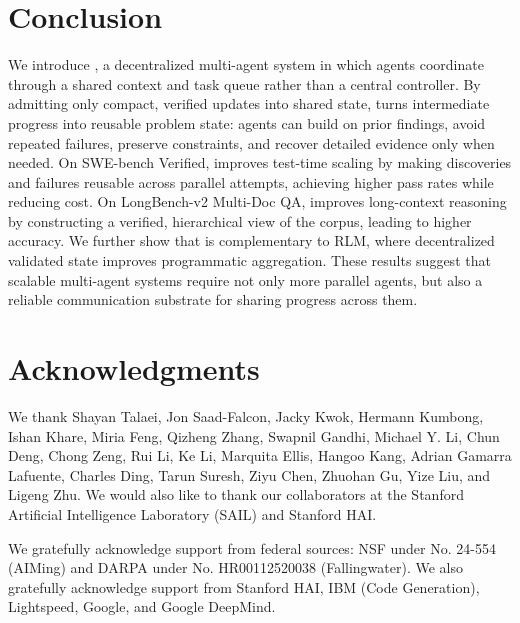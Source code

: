 \section{Conclusion}
\vspace{-1mm}
We introduce \toolName{}, a decentralized multi-agent system in which agents coordinate through a shared context and task queue rather than a central controller. By admitting only compact, verified updates into shared state, \toolName{} turns intermediate progress into reusable problem state: agents can build on prior findings, avoid repeated failures, preserve constraints, and recover detailed evidence only when needed. On SWE-bench Verified, \toolName{} improves test-time scaling by making discoveries and failures reusable across parallel attempts, achieving higher pass rates while reducing cost. On LongBench-v2 Multi-Doc QA, \toolName{} improves long-context reasoning by constructing a verified, hierarchical view of the corpus, leading to higher accuracy. We further show that \toolName{} is complementary to RLM, where decentralized validated state improves programmatic aggregation. These results suggest that scalable multi-agent systems require not only more parallel agents, but also a reliable communication substrate for sharing progress across them.


\section{Acknowledgments}
We thank Shayan Talaei, Jon Saad-Falcon, Jacky Kwok, Hermann Kumbong, Ishan Khare, Miria Feng, Qizheng Zhang, Swapnil Gandhi, Michael Y. Li, Chun Deng, Chong Zeng, Rui Li, Ke Li, Marquita Ellis, Hangoo Kang, Adrian Gamarra Lafuente, Charles Ding, Tarun Suresh, Ziyu Chen, Zhuohan Gu, Yize Liu, and Ligeng Zhu. We would also like to thank our collaborators at the Stanford Artificial Intelligence Laboratory (SAIL) and Stanford HAI.

We gratefully acknowledge support from federal sources: NSF under No. 24-554 (AIMing) and DARPA under No. HR00112520038 (Fallingwater). We also gratefully acknowledge support from Stanford HAI, IBM (Code Generation), Lightspeed, Google, and Google DeepMind.